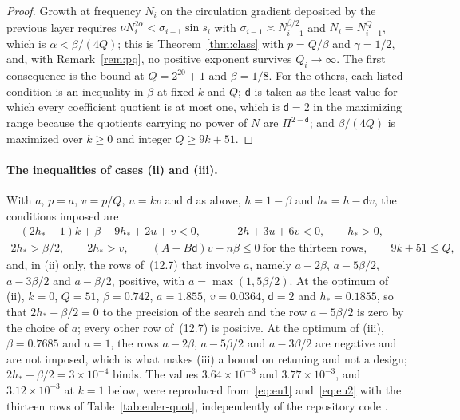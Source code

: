 \documentclass[11pt]{article}
\theoremstyle{remark}
\newcommand{\ev}[1]{\hspace{0.2em}{\small\textsf{[#1]}}}
\begin{document}
\begin{proof}
Growth at frequency $N_{i}$ on the circulation gradient deposited by the previous layer requires
$\nu N_{i}^{2\alpha}<\sigma_{i-1}\sin s_{i}$ with $\sigma_{i-1}\asymp N_{i-1}^{\beta/2}$ and
$N_{i}=N_{i-1}^{Q}$, which is $\alpha<\beta/(4Q)$; this is Theorem~\ref{thm:class} with $p=Q/\beta$
and $\gamma=1/2$, and, with Remark~\ref{rem:pq}, no positive exponent survives $Q_{i}\to\infty$. The first
consequence is the bound at $Q=2^{20}+1$ and $\beta=1/8$. For the
others, each listed condition is an inequality in $\beta$ at fixed $k$ and $Q$; $\mathsf d$ is taken
as the least value for which every coefficient quotient is at most one, which is $\mathsf d=2$ in the
maximizing range because the quotients carrying no power of $N$ are $\Pi^{2-\mathsf d}$; and
$\beta/(4Q)$ is maximized over $k\ge0$ and integer $Q\ge9k+51$.
\end{proof}

\paragraph{The inequalities of cases (ii) and (iii).} With $a$, $p=a$, $v=p/Q$, $u=kv$ and $\mathsf d$
as above, $h=1-\beta$ and $h_{*}=h-\mathsf dv$, the conditions imposed are
\begin{gather}
-(2h_{*}-1)k+\beta-9h_{*}+2u+v<0,\qquad -2h+3u+6v<0,\qquad h_{*}>0,\label{eq:eu1}\\
2h_{*}>\beta/2,\qquad 2h_{*}>v,\qquad (A-B\mathsf d)v-n\beta\le0\ \text{for the thirteen rows},\qquad 9k+51\le Q,\label{eq:eu2}
\end{gather}
and, in (ii) only, the rows of~(12.7) that involve $a$, namely $a-2\beta$, $a-5\beta/2$, $a-3\beta/2$ and
$a-\beta/2$, positive, with $a=\max(1,5\beta/2)$. At the optimum of (ii), $k=0$, $Q=51$, $\beta=0.742$,
$a=1.855$, $v=0.0364$, $\mathsf d=2$ and $h_{*}=0.1855$, so that $2h_{*}-\beta/2=0$ to the precision
of the search and the row $a-5\beta/2$ is zero by the choice of $a$; every other row of~(12.7) is
positive. At the optimum of (iii), $\beta=0.7685$ and $a=1$, the rows $a-2\beta$, $a-5\beta/2$ and
$a-3\beta/2$ are negative and are not imposed, which is what makes (iii) a bound on retuning and not a
design; $2h_{*}-\beta/2=3\times10^{-4}$ binds. The values $3.64\times10^{-3}$ and $3.77\times10^{-3}$,
and $3.12\times10^{-3}$ at $k=1$ below, were reproduced from~\eqref{eq:eu1} and~\eqref{eq:eu2} with
the thirteen rows of Table~\ref{tab:euler-quot}, independently of the repository code \ev{MV}.
\end{document}
